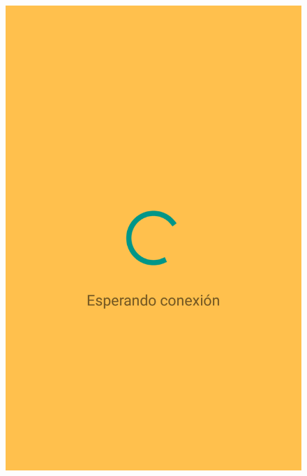 \begin{slide}
  \begin{center}
    \begin{minipage}[b]{0.3\linewidth}
      \begin{center}
        \begin{figure}
          \includegraphics[height=0.65\textheight]{img/navigantobluetooth-ini.png}
        \end{figure}
      \end{center}
    \end{minipage}
    \begin{minipage}[b]{0.3\linewidth}
      \begin{center}
        \begin{figure}

\end{figure}
\end{center}
\end{minipage}
\end{center}
\end{slide}
